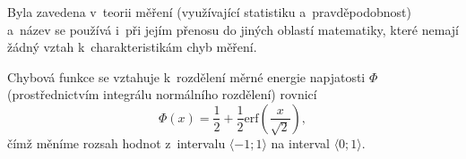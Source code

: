 Byla zavedena v~teorii měření (využívající statistiku a~pravděpodobnost) a~název se používá i~při jejím přenosu do jiných oblastí matematiky, které nemají žádný vztah k~charakteristikám chyb měření.

Chybová funkce se vztahuje k~rozdělení měrné energie napjatosti $\varPhi$ (prostřednictvím integrálu normálního rozdělení) rovnicí
\begin{equation}
	\varPhi(x) = \frac{1}{2} + \frac{1}{2} \mathrm{erf}\left(\frac{x}{\sqrt{2}}\right),
\end{equation}
čímž měníme rozsah hodnot z~intervalu $\langle -1;1 \rangle$ na interval $\langle 0;1 \rangle$.

